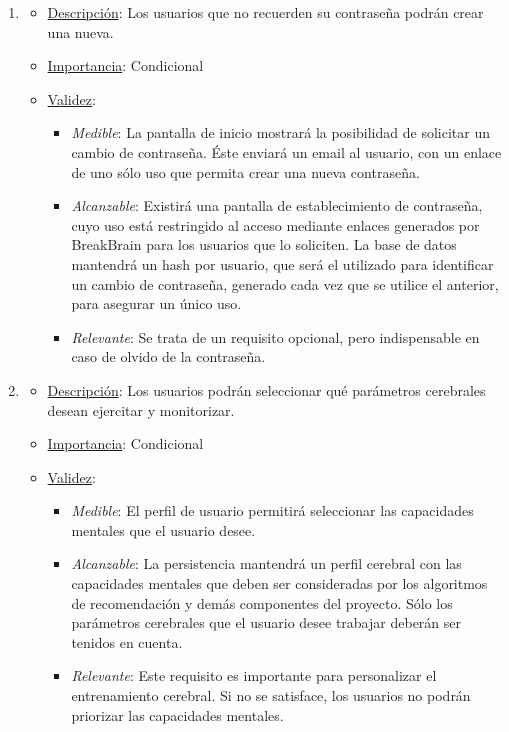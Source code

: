 \begin{enumerate}
\item %
  \begin{itemize}
  \item \underline{Descripción}: Los usuarios que no recuerden su contraseña podrán crear una nueva.
  \item \underline{Importancia}: Condicional
  \item \underline{Validez}:
    \begin{itemize}
    \item \textit{Medible}: La pantalla de inicio mostrará la posibilidad de solicitar un cambio de contraseña. Éste enviará un email al usuario, con un enlace de uno sólo uso que permita crear una nueva contraseña.
    \item \textit{Alcanzable}: Existirá una pantalla de establecimiento de contraseña, cuyo uso está restringido al acceso mediante enlaces generados por BreakBrain para los usuarios que lo soliciten. La base de datos mantendrá un hash por usuario, que será el utilizado para identificar un cambio de contraseña, generado cada vez que se utilice el anterior, para asegurar un único uso.
    \item \textit{Relevante}: Se trata de un requisito opcional, pero indispensable en caso de olvido de la contraseña.
    \end{itemize}
  \end{itemize}

\item %
  \begin{itemize}
  \item \underline{Descripción}: Los usuarios podrán seleccionar qué parámetros cerebrales desean ejercitar y monitorizar.
  \item \underline{Importancia}: Condicional
  \item \underline{Validez}:
    \begin{itemize}
    \item \textit{Medible}: El perfil de usuario permitirá seleccionar las capacidades mentales que el usuario desee.
    \item \textit{Alcanzable}: La persistencia mantendrá un perfil cerebral con las capacidades mentales que deben ser consideradas por los algoritmos de recomendación y demás componentes del proyecto. Sólo los parámetros cerebrales que el usuario desee trabajar deberán ser tenidos en cuenta.
    \item \textit{Relevante}: Este requisito es importante para personalizar el entrenamiento cerebral. Si no se satisface, los usuarios no podrán priorizar las capacidades mentales.
    \end{itemize}
  \end{itemize}


\end{enumerate}
